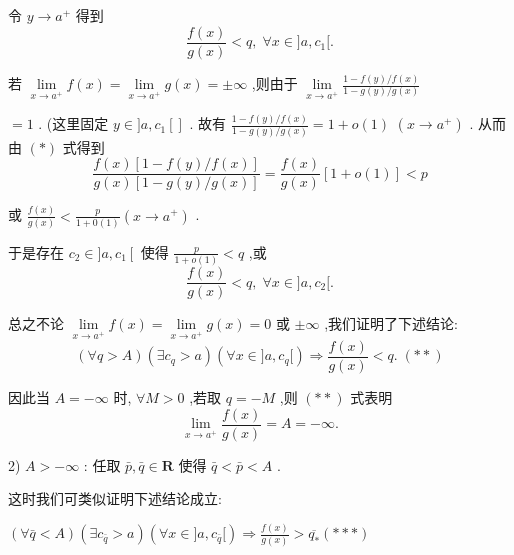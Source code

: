 令 $y \rightarrow  {a}^{ + }$ 得到
$$\frac{f\left( x\right) }{g\left( x\right) } < q,\;\forall x \in  \rbrack a,{c}_{1}\lbrack .$$

若 $\mathop{\lim }\limits_{{x \rightarrow  {a}^{ + }}}f\left( x\right)  = \mathop{\lim }\limits_{{x \rightarrow  {a}^{ + }}}g\left( x\right)  =  \pm  \infty$ ,则由于 $\mathop{\lim }\limits_{{x \rightarrow  {a}^{ + }}}\frac{1 - f\left( y\right) /f\left( x\right) }{1 - g\left( y\right) /g\left( x\right) }$

$= 1$ . (这里固定 $y \in  \rbrack a,{c}_{1}\left\lbrack  \right\rbrack$ . 故有 $\frac{1 - f\left( y\right) /f\left( x\right) }{1 - g\left( y\right) /g\left( x\right) } = 1 + o\left( 1\right)$  $\left( {x \rightarrow  {a}^{ + }}\right)$ . 从而由 $\left( *\right)$ 式得到
$$\frac{f\left( x\right) \left\lbrack  {1 - f\left( y\right) /f\left( x\right) }\right\rbrack  }{g\left( x\right) \left\lbrack  {1 - g\left( y\right) /g\left( x\right) }\right\rbrack  } = \frac{f\left( x\right) }{g\left( x\right) }\left\lbrack  {1 + o\left( 1\right) }\right\rbrack   < p$$

或 $\frac{f\left( x\right) }{g\left( x\right) } < \frac{p}{1 + 0\left( 1\right) }\left( {x \rightarrow  {a}^{ + }}\right)$ .

于是存在 ${c}_{2} \in  \rbrack a,{c}_{1}\left\lbrack  \right.$ 使得 $\frac{p}{1 + o\left( 1\right) } < q$ ,或
$$\frac{f\left( x\right) }{g\left( x\right) } < q,\;\forall x \in  \rbrack a,{c}_{2}\lbrack .$$

总之不论 $\mathop{\lim }\limits_{{x \rightarrow  {a}^{ + }}}f\left( x\right)  = \mathop{\lim }\limits_{{x \rightarrow  {a}^{ + }}}g\left( x\right)  = 0$ 或 $\pm  \infty$ ,我们证明了下述结论:
$$\left( {\forall q > A}\right) \left( {\exists {c}_{q} > a}\right) \left( {\forall x \in  \rbrack a,{c}_{q}\lbrack }\right)  \Rightarrow  \frac{f\left( x\right) }{g\left( x\right) } < q.\;\left( {* * }\right)$$

因此当 $A =  - \infty$ 时, $\forall M > 0$ ,若取 $q =  - M$ ,则 $\left( {* * }\right)$ 式表明
$$\mathop{\lim }\limits_{{x \rightarrow  {a}^{ + }}}\frac{f\left( x\right) }{g\left( x\right) } = A =  - \infty .$$

2) $A >  - \infty$ : 任取 $\bar{p},\bar{q} \in  \mathbf{R}$ 使得 $\bar{q} < \bar{p} < A$ .

这时我们可类似证明下述结论成立:

$\left( {\forall \bar{q} < A}\right) \left( {\exists {c}_{\bar{q}} > a}\right) \left( {\forall x \in  \rbrack a,{c}_{\bar{q}}\lbrack }\right)  \Rightarrow  \frac{f\left( x\right) }{g\left( x\right) } > \overline{{q}_{ * }}\left( {* *  * }\right)$

